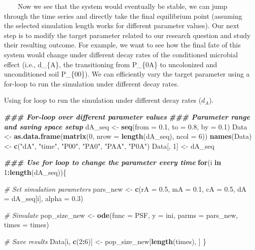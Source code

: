 \documentclass[
]{book}
\newenvironment{Shaded}{\begin{snugshade}}{\end{snugshade}}
\newcommand{\AttributeTok}[1]{\textcolor[rgb]{0.13,0.29,0.53}{#1}}
\newcommand{\CommentTok}[1]{\textcolor[rgb]{0.56,0.35,0.01}{\textit{#1}}}
\newcommand{\ControlFlowTok}[1]{\textcolor[rgb]{0.13,0.29,0.53}{\textbf{#1}}}
\newcommand{\DecValTok}[1]{\textcolor[rgb]{0.00,0.00,0.81}{#1}}
\newcommand{\DocumentationTok}[1]{\textcolor[rgb]{0.56,0.35,0.01}{\textbf{\textit{#1}}}}
\newcommand{\FloatTok}[1]{\textcolor[rgb]{0.00,0.00,0.81}{#1}}
\newcommand{\FunctionTok}[1]{\textcolor[rgb]{0.13,0.29,0.53}{\textbf{#1}}}
\newcommand{\NormalTok}[1]{#1}
\newcommand{\OtherTok}[1]{\textcolor[rgb]{0.56,0.35,0.01}{#1}}
\newcommand{\SpecialCharTok}[1]{\textcolor[rgb]{0.81,0.36,0.00}{\textbf{#1}}}
\newcommand{\StringTok}[1]{\textcolor[rgb]{0.31,0.60,0.02}{#1}}
\begin{document}
~~~~Now we see that the system would eventually be stable, we can jump through the time series and directly take the final equilibrium point (assuming the selected simulation length works for different parameter values). Our next step is to modify the target parameter related to our research question and study their resulting outcome. For example, we want to see how the final fate of this system would change under different decay rates of the conditioned microbial effect (i.e., d\_\{A\}, the transitioning from P\_\{0A\} to uncolonized and unconditioned soil P\_\{00\}). We can efficiently vary the target parameter using a for-loop to run the simulation under different decay rates.

Using for loop to run the simulation under different decay rates (\(d_{A}\)).

\begin{Shaded}
\begin{Highlighting}[]
\DocumentationTok{\#\#\# For{-}loop over different parameter values }
\DocumentationTok{\#\#\# Parameter range and saving space setup}
\NormalTok{dA\_seq }\OtherTok{\textless{}{-}} \FunctionTok{seq}\NormalTok{(}\AttributeTok{from =} \FloatTok{0.1}\NormalTok{, }\AttributeTok{to =} \FloatTok{0.8}\NormalTok{, }\AttributeTok{by =} \FloatTok{0.1}\NormalTok{)}
\NormalTok{Data }\OtherTok{\textless{}{-}} \FunctionTok{as.data.frame}\NormalTok{(}\FunctionTok{matrix}\NormalTok{(}\DecValTok{0}\NormalTok{, }\AttributeTok{nrow =} \FunctionTok{length}\NormalTok{(dA\_seq), }\AttributeTok{ncol =} \DecValTok{6}\NormalTok{))}
\FunctionTok{names}\NormalTok{(Data) }\OtherTok{\textless{}{-}} \FunctionTok{c}\NormalTok{(}\StringTok{"dA"}\NormalTok{, }\StringTok{"time"}\NormalTok{, }\StringTok{"P00"}\NormalTok{, }\StringTok{"PA0"}\NormalTok{, }\StringTok{"PAA"}\NormalTok{, }\StringTok{"P0A"}\NormalTok{)}
\NormalTok{Data[, }\DecValTok{1}\NormalTok{] }\OtherTok{\textless{}{-}}\NormalTok{ dA\_seq}

\DocumentationTok{\#\#\# Use for loop to change the parameter every time}
\ControlFlowTok{for}\NormalTok{(i }\ControlFlowTok{in} \DecValTok{1}\SpecialCharTok{:}\FunctionTok{length}\NormalTok{(dA\_seq))\{}
  
  \CommentTok{\# Set simulation parameters}
\NormalTok{  pars\_new }\OtherTok{\textless{}{-}} \FunctionTok{c}\NormalTok{(}\AttributeTok{rA =} \FloatTok{0.5}\NormalTok{, }\AttributeTok{mA =} \FloatTok{0.1}\NormalTok{, }\AttributeTok{cA =} \FloatTok{0.5}\NormalTok{, }\AttributeTok{dA =}\NormalTok{ dA\_seq[i], }\AttributeTok{alpha =} \FloatTok{0.3}\NormalTok{)}
  
  \CommentTok{\# Simulate}
\NormalTok{  pop\_size\_new }\OtherTok{\textless{}{-}} \FunctionTok{ode}\NormalTok{(}\AttributeTok{func =}\NormalTok{ PSF, }\AttributeTok{y =}\NormalTok{ ini, }\AttributeTok{parms =}\NormalTok{ pars\_new, }\AttributeTok{times =}\NormalTok{ times)}
  
  \CommentTok{\# Save results}
\NormalTok{  Data[i, }\FunctionTok{c}\NormalTok{(}\DecValTok{2}\SpecialCharTok{:}\DecValTok{6}\NormalTok{)] }\OtherTok{\textless{}{-}}\NormalTok{ pop\_size\_new[}\FunctionTok{length}\NormalTok{(times), ]}
\NormalTok{\}}
\end{Highlighting}
\end{Shaded}
\end{document}
